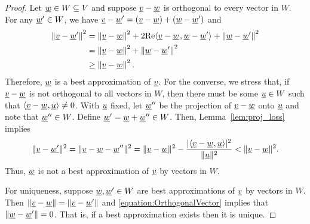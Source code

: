 \begin{proof}
Let $\underline{w} \in W \subseteq V$ and suppose $\underline{v} - \underline{w}$ is orthogonal to every vector in $W$.
For any $\underline{w}' \in W$, we have $\underline{v} - \underline{w}' = \left( \underline{v} - \underline{w} \right) + \left( \underline{w} - \underline{w}' \right)$ and
\begin{equation} \label{equation:OrthogonalVector}
\begin{split}
\left\| \underline{v} - \underline{w}' \right\|^2
&= \left\| \underline{v} - \underline{w} \right\|^2
+ 2 \mathrm{Re} {\left\langle  \underline{v} - \underline{w}  \mskip2mu ,  \underline{w} - \underline{w}'  \right\rangle}
+ \left\| \underline{w} - \underline{w}' \right\|^2 \\
&= \left\| \underline{v} - \underline{w} \right\|^2
+ \left\| \underline{w} - \underline{w}' \right\|^2 \\
&\geq \left\| \underline{v} - \underline{w} \right\|^2.
\end{split}
\end{equation}
Therefore, $\underline{w}$ is a best approximation of $\underline{v}$.
For the converse, we stress that, if $\underline{v}-\underline{w}$ is not orthogonal to all vectors in $W$, then there must be some $\underline{u} \in W$ such that ${\langle  \underline{v}-\underline{w}  \mskip1mu ,  \underline{u}  \rangle} \neq 0$.
With $\underline{u}$ fixed, let $\underline{w}''$ be the projection of $\underline{v}-\underline{w}$ onto $\underline{u}$ and note that $\underline{w}'' \in W$.
Define $\underline{w}' = \underline{w}+\underline{w}'' \in W$.
Then, Lemma~\ref{lem:proj_loss} implies
\[ \| \underline{v}-\underline{w'} \| ^2 = \| \underline{v}-\underline{w} - \underline{w}'' \| ^2 = \|\underline{v}-\underline{w}\|^2 - \frac{|{\langle  \underline{v}-\underline{w}  \mskip1mu ,  \underline{u}  \rangle}|^2}{\|\underline{u}\|^2} < \| \underline{v}-\underline{w}\|^2. \]
Thus, $\underline{w}$ is not a best approximation of $\underline{v}$ by vectors in $W$.

For uniqueness, suppose $\underline{w}, \underline{w}' \in W$ are best approximations of $\underline{v}$ by vectors in $W$.
Then $\left\| \underline{v} - \underline{w} \right\| = \left\| \underline{v} - \underline{w}' \right\|$ and \eqref{equation:OrthogonalVector} implies that $\left\| \underline{w} - \underline{w}' \right\| = 0$.
That is, if a best approximation exists then it is unique.


\end{proof}
